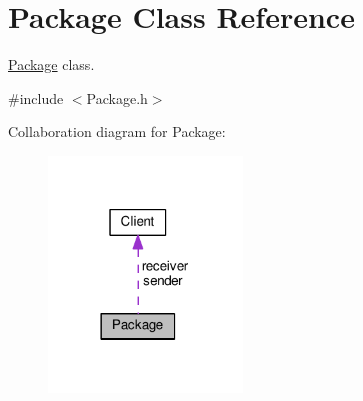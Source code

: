 \hypertarget{classPackage}{}\section{Package Class Reference}
\label{classPackage}


\hyperlink{classPackage}{Package} class.  




{\ttfamily \#include $<$Package.\+h$>$}



Collaboration diagram for Package\+:\nopagebreak
\begin{figure}[H]
\begin{center}
\leavevmode
\includegraphics[width=146pt]{classPackage__coll__graph}
\end{center}
\end{figure}
